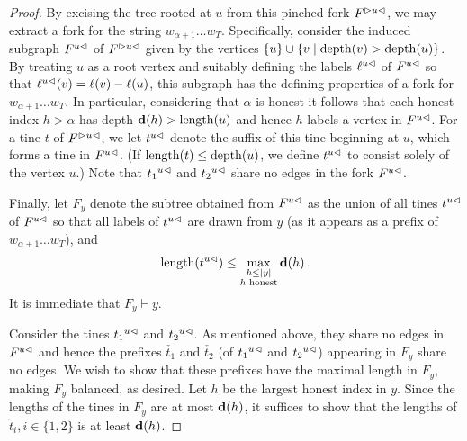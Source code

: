 \begin{proof}
    By excising the tree rooted at $u$ from this pinched fork
    $\pinch{u}{F}$, we may extract a fork for the string
    $w_{\alpha+1} \dots w_T$. Specifically, consider the induced
    subgraph $\cut{u}{F}$ of $\pinch{u}{F}$ given by the vertices
    $\{u\} \cup \{ v \mid \depth(v) > \depth(u)\}$. By treating $u$ as a
    root vertex and suitably defining the labels $\cut{u}{\ell}$ of
    $\cut{u}{F}$ so that $\cut{u}{\ell}(v) = \ell(v) - \ell(u)$, this
    subgraph has the defining properties of a fork for
    $w_{\alpha+1} \ldots w_T$. In particular, considering that
    $\alpha$ is honest it follows that each honest index $h > \alpha$
    has depth $\hdepth(h) > \length(u)$ and hence $h$ labels a vertex in
    $\cut{u}{F}$.  For a tine $t$ of $\pinch{u}{F}$, we let $\cut{u}{t}$
    denote the suffix of this tine beginning at $u$, which forms a tine
    in $\cut{u}{F}$. (If $\length(t) \leq \depth(u)$, we define
    $\cut{u}{t}$ to consist solely of the vertex $u$.)  Note that
    $\cut{u}{t_1}$ and $\cut{u}{t_2}$ share no edges in the fork
    $\cut{u}{F}$.
    
    Finally, let $F_y$ denote the subtree obtained from $\cut{u}{F}$
    as the union of all tines $\cut{u}{t}$ of $\cut{u}{F}$ so that all
    labels of $\cut{u}{t}$ are drawn from $y$ (as it appears as a prefix
    of $w_{\alpha+1} \ldots w_T$), and
    \begin{equation}\label{eq:tines-Fy}
      \length(\cut{u}{t}) \leq \max_{\substack{h \leq |y|\\ \text{$h$ honest} } } \hdepth(h)
      \,.
    \end{equation}
    It is immediate that $F_y \vdash y$. 
    
    Consider the tines $\cut{u}{t_1}$ and $\cut{u}{t_2}$. As mentioned
    above, they share no edges in $\cut{u}{F}$ and hence the prefixes
    $\check{t_1}$ and $\check{t_2}$ (of $\cut{u}{t_1}$ and
    $\cut{u}{t_2}$) appearing in $F_y$ share no edges. 
    We wish to
    show that these prefixes have the maximal length in $F_y$, making $F_y$ balanced, as desired. 
    Let $h$ be the largest honest index in $y$. 
    Since the lengths of the tines in $F_y$ 
    are at most $\hdepth(h)$, 
    it suffices to show that the lengths of 
    $\check{t}_i, i \in \{1,2\}$ is at least $\hdepth(h)$. 


\end{proof}
